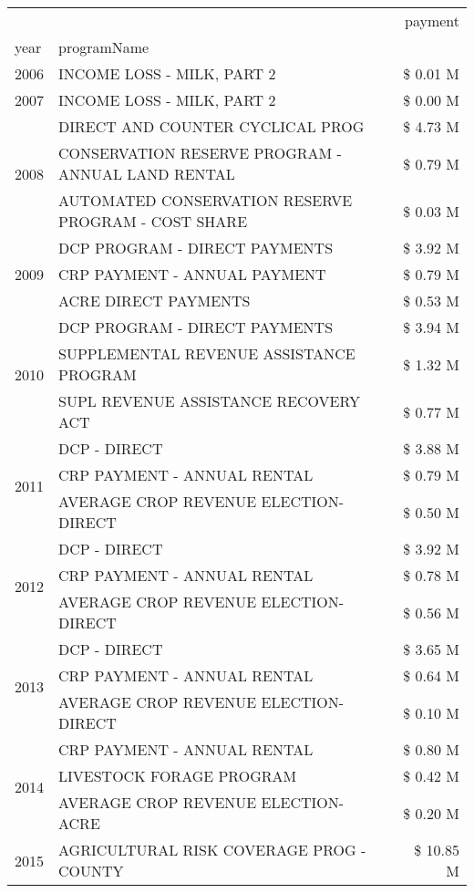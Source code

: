 \begin{tabular}{llr}
\toprule
 &  & payment \\
year & programName &  \\
\midrule
2006 & INCOME LOSS - MILK, PART 2 & \$ 0.01 M \\
\cline{1-3}
2007 & INCOME LOSS - MILK, PART 2 & \$ 0.00 M \\
\cline{1-3}
\multirow[t]{3}{*}{2008} & DIRECT AND COUNTER CYCLICAL PROG & \$ 4.73 M \\
 & CONSERVATION RESERVE PROGRAM - ANNUAL LAND RENTAL & \$ 0.79 M \\
 & AUTOMATED CONSERVATION RESERVE PROGRAM - COST SHARE & \$ 0.03 M \\
\cline{1-3}
\multirow[t]{3}{*}{2009} & DCP PROGRAM - DIRECT PAYMENTS & \$ 3.92 M \\
 & CRP PAYMENT - ANNUAL PAYMENT & \$ 0.79 M \\
 & ACRE DIRECT PAYMENTS & \$ 0.53 M \\
\cline{1-3}
\multirow[t]{3}{*}{2010} & DCP PROGRAM - DIRECT PAYMENTS & \$ 3.94 M \\
 & SUPPLEMENTAL REVENUE ASSISTANCE PROGRAM & \$ 1.32 M \\
 & SUPL REVENUE ASSISTANCE RECOVERY ACT & \$ 0.77 M \\
\cline{1-3}
\multirow[t]{3}{*}{2011} & DCP - DIRECT & \$ 3.88 M \\
 & CRP PAYMENT - ANNUAL RENTAL & \$ 0.79 M \\
 & AVERAGE CROP REVENUE ELECTION-DIRECT & \$ 0.50 M \\
\cline{1-3}
\multirow[t]{3}{*}{2012} & DCP - DIRECT & \$ 3.92 M \\
 & CRP PAYMENT - ANNUAL RENTAL & \$ 0.78 M \\
 & AVERAGE CROP REVENUE ELECTION-DIRECT & \$ 0.56 M \\
\cline{1-3}
\multirow[t]{3}{*}{2013} & DCP - DIRECT & \$ 3.65 M \\
 & CRP PAYMENT - ANNUAL RENTAL & \$ 0.64 M \\
 & AVERAGE CROP REVENUE ELECTION-DIRECT & \$ 0.10 M \\
\cline{1-3}
\multirow[t]{3}{*}{2014} & CRP PAYMENT - ANNUAL RENTAL & \$ 0.80 M \\
 & LIVESTOCK FORAGE PROGRAM & \$ 0.42 M \\
 & AVERAGE CROP REVENUE ELECTION-ACRE & \$ 0.20 M \\
\cline{1-3}
\multirow[t]{3}{*}{2015} & AGRICULTURAL RISK COVERAGE PROG - COUNTY & \$ 10.85 M \\

\end{tabular}
